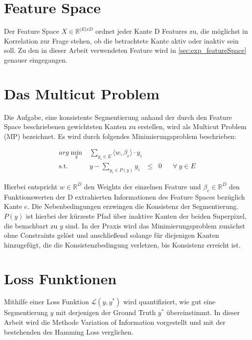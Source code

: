 \section{Feature Space}\label{sec:featureSpace}

Der Feature Space $X \in \mathbb{R}^{|E|xD}$ ordnet jeder Kante D Features zu, die möglichst in Korrelation zur Frage stehen, ob die betrachtete Kante aktiv oder inaktiv sein soll. Zu den in dieser Arbeit verwendeten Feature wird in \ref{sec:exp_featureSpace} genauer eingegangen.



\section{Das Multicut Problem}\label{sec:multicutProb}

Die Aufgabe, eine konsistente Segmentierung anhand der durch den Feature Space beschriebenen gewichteten Kanten zu erstellen, wird als Multicut Problem (MP) bezeichnet. Es wird durch folgendes Minimierungsproblem beschrieben: 


\begin{equation} 
\begin{array}{rrclcl}
\displaystyle arg \min_{y} & \sum\limits_{y_i \in E} \langle w, \beta_e \rangle \cdot y_i \\
\textrm{s.t.} &  y - \sum\limits_{y_i \in P(y)} y_i & \le & 0 & & \forall \ y \in E
\end{array}
\label{eq:mp}
\end{equation}


Hierbei entspricht $w \in \mathbb{R}^D$ den Weights der einzelnen Feature und $\beta_e \in \mathbb{R}^D$ den Funktionswerten der D extrahierten Informationen des Feature Spaces bezüglich Kante $e$. Die Nebenbedingungen erzwingen die Konsistenz der Segmentierung. $P(y)$ ist hierbei der kürzeste Pfad über inaktive Kanten der beiden Superpixel, die benachbart zu $y$ sind. In der Praxis wird das Minimierungsproblem zunächst ohne Constraints gelöst und anschließend solange für diejenigen Kanten hinzugefügt, die die Konsistenzbedingung verletzen, bis Konsistenz erreicht ist.

\section{Loss Funktionen}\label{sec:loss-fkts}

Mithilfe einer Loss Funktion $\mathcal{L}(y, y^*)$ wird quantifiziert, wie gut eine Segmentierung $y$ mit derjenigen der Ground Truth $y^*$ übereinstimmt. In dieser Arbeit wird die Methode Variation of Information vorgestellt und mit der bestehenden des Hamming Loss verglichen.

